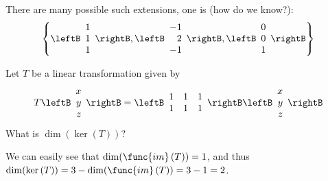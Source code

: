 \begin{enumialphparenastyle}
\begin{ex}
\begin{sol}
There are many possible such extensions, one is (how do we know?):
\begin{equation*}
\left\{ \leftB 
\begin{array}{r}
1 \\ 
1 \\ 
1
\end{array}
\rightB ,\leftB 
\begin{array}{r}
-1 \\ 
2 \\ 
-1
\end{array}
\rightB ,\leftB 
\begin{array}{r}
0  \\ 
0\\ 
1
\end{array}
\rightB 
\right\}
\end{equation*}
\end{sol}
\end{ex}

\begin{ex}
 Let $T$ be a linear transformation given by 
\[
T \leftB \begin{array}{r}
x\\
y \\
z
\end{array}\rightB = \leftB \begin{array}{rrr}
1 & 1 & 1 \\
1 & 1 & 1
\end{array}\rightB
\leftB \begin{array}{r}
x\\
y \\
z
\end{array}\rightB
\]
What is $\dim  ( \ker \left( T \right) )$?

\begin{sol}
We can easily see that $\dim  ( \func{im} \left( T \right) ) =1$, and thus 
$\dim  ( \ker \left( T \right) ) = 3 - \dim  ( \func{im} \left( T \right) ) = 3- 1 = 2$.
\end{sol}
\end{ex}

\end{enumialphparenastyle}